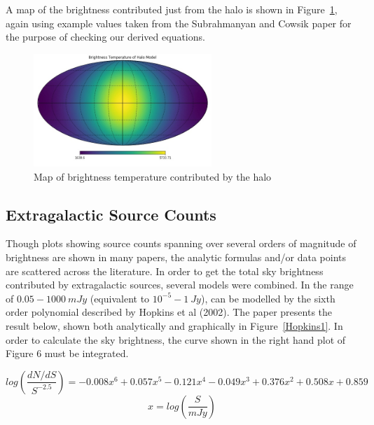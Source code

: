 \documentclass[letterpaper, 10pt]{article}
\begin{document}
A map of the brightness contributed just from the halo is shown in Figure~\ref{halo_map}, again using example values taken from the Subrahmanyan and Cowsik paper for the purpose of checking our derived equations.

\begin{figure}[h]
\begin{center}
\includegraphics[width=0.6\textwidth]{halo.jpg}
\caption{Map of brightness temperature contributed by the halo}
\label{halo_map}
\end{center}
\end{figure}


\subsection{Extragalactic Source Counts}

Though plots showing source counts spanning over several orders of magnitude of brightness are shown in many papers, the analytic formulas and/or data points are scattered across the literature. In order to get the total sky brightness contributed by extragalactic sources, several models were combined. In the range of $0.05 - 1000\ mJy$ (equivalent to $10^{-5} - 1\ Jy$), can be modelled by the sixth order polynomial described by Hopkins et al (2002). The paper presents the result below, shown both analytically and graphically in Figure~\ref{Hopkins1}. In order to calculate the sky brightness, the curve shown in the right hand plot of Figure 6 must be integrated. 

\[ log\left(\frac{dN/dS}{S^{-2.5}}\right) = -0.008x^{6} + 0.057x^{5} - 0.121x^{4} - 0.049x^{3} + 0.376x^{2} + 0.508x + 0.859 \] \[x = log\left(\frac{S}{mJy}\right) \]
\end{document}
